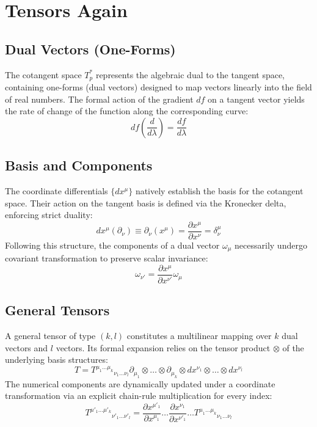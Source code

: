 \documentclass[11pt, a4paper]{report}
\begin{document}
\section{Tensors Again}
\subsection*{Dual Vectors (One-Forms)}
The cotangent space $T_p^*$ represents the algebraic dual to the tangent space, containing one-forms (dual vectors) designed to map vectors linearly into the field of real numbers. The formal action of the gradient $df$ on a tangent vector yields the rate of change of the function along the corresponding curve:
\begin{equation} df\left(\frac{d}{d\lambda}\right) = \frac{df}{d\lambda} \end{equation}

\subsection*{Basis and Components}
The coordinate differentials $\{dx^\mu\}$ natively establish the basis for the cotangent space. Their action on the tangent basis is defined via the Kronecker delta, enforcing strict duality:
\begin{equation} dx^\mu (\partial_\nu) \equiv \partial_\nu (x^\mu) = \frac{\partial x^\mu}{\partial x^\nu} = \delta^\mu_\nu \end{equation}
Following this structure, the components of a dual vector $\omega_\mu$ necessarily undergo covariant transformation to preserve scalar invariance:
\begin{equation} \omega_{\nu'} = \frac{\partial x^\mu}{\partial x^{\nu'}} \omega_\mu \end{equation}

\subsection*{General Tensors}
A general tensor of type $(k,l)$ constitutes a multilinear mapping over $k$ dual vectors and $l$ vectors. Its formal expansion relies on the tensor product $\otimes$ of the underlying basis structures:
\begin{equation} T = {T^{\mu_1 \dots \mu_k}}_{\nu_1 \dots \nu_l} \partial_{\mu_1} \otimes \dots \otimes \partial_{\mu_k} \otimes dx^{\nu_1} \otimes \dots \otimes dx^{\nu_l} \end{equation}
The numerical components are dynamically updated under a coordinate transformation via an explicit chain-rule multiplication for every index:
\begin{equation} {T^{\mu'_1 \dots \mu'_k}}_{\nu'_1 \dots \nu'_l} = \frac{\partial x^{\mu'_1}}{\partial x^{\mu_1}} \dots \frac{\partial x^{\nu_1}}{\partial x^{\nu'_1}} \dots {T^{\mu_1 \dots \mu_k}}_{\nu_1 \dots \nu_l} \end{equation}
\end{document}
